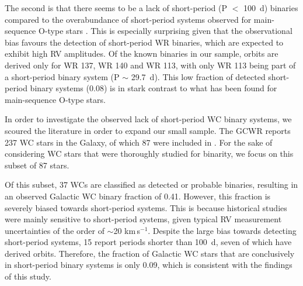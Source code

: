 The second is that there seems to be a lack of short-period (P $<$ 100~d) binaries compared to the overabundance of short-period systems observed for main-sequence O-type stars \citep[][]{sana_binary_2012}. This is especially surprising given that the observational bias favours the detection of short-period WR binaries, which are expected to exhibit high RV amplitudes. Of the known binaries in our sample, orbits are derived only for WR 137, WR 140 and WR 113, with only WR 113 being part of a short-period binary system (P $\sim$ 29.7~d). This low fraction of detected short-period binary systems (0.08) is in stark contrast to what has been found for main-sequence O-type stars.

In order to investigate the observed lack of short-period WC binary systems, we scoured the literature in order to expand our small sample. The GCWR reports 237 WC stars in the Galaxy, of which 87 were included in . For the sake of considering WC stars that were thoroughly studied for binarity, we focus on this subset of 87 stars. 

Of this subset, 37 WCs are classified as detected or probable binaries, resulting in an observed Galactic WC binary fraction of 0.41. However, this fraction is severely biased towards short-period systems. This is because historical studies were mainly sensitive to short-period systems, given typical RV measurement uncertainties of the order of ${\sim}$20 km\,s$^{-1}$. Despite the large bias towards detecting short-period systems, 15 report periods shorter than 100~d, seven of which have derived orbits. Therefore, the fraction of Galactic WC stars that are conclusively in short-period binary systems is only 0.09, which is consistent with the findings of this study. 

